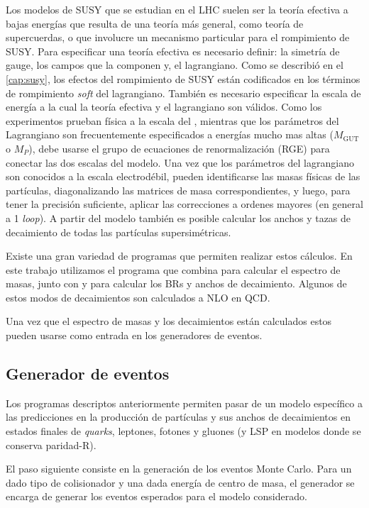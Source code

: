Los modelos de SUSY que se estudian en el LHC suelen ser la teoría efectiva a
bajas energías que resulta de una teoría más general, como teoría de
supercuerdas, o que involucre un mecanismo particular para el rompimiento de
SUSY. Para especificar una teoría efectiva es necesario definir: la simetría de
gauge, los campos que la componen y, el lagrangiano. Como se describió en el
\cref{cap:susy}, los efectos del rompimiento de SUSY están codificados en los
términos de rompimiento \emph{soft} del lagrangiano. También es necesario especificar
la escala de energía a la cual la teoría efectiva y el lagrangiano son válidos.
Como los experimentos prueban física a la escala del {\tev}, mientras que los
parámetros del Lagrangiano son frecuentemente especificados a energías mucho mas
altas ($M_\text{GUT}$ o $M_P$), debe usarse el grupo de ecuaciones de
renormalización (RGE) para conectar las dos escalas del modelo. Una vez que los
parámetros del lagrangiano son conocidos a la escala electrodébil, pueden
identificarse las masas físicas de las partículas, diagonalizando las matrices
de masa correspondientes, y luego, para tener la precisión suficiente, aplicar
las correcciones a ordenes mayores (en general a 1 \emph{loop}). A partir del modelo
también es posible calcular los anchos y tazas de decaimiento de todas las
partículas supersimétricas.

Existe una gran variedad de programas que permiten realizar estos cálculos. En
este trabajo utilizamos el programa {\susyhit}\cite{Djouadi:2006bz} que combina
{\suspect}\cite{Djouadi2007426} para calcular el espectro de masas, junto con
{\sdecay}\cite{Muhlleitner:2004mka} y {\hdecay}\cite{Djouadi:1997yw} para
calcular los BRs y anchos de decaimiento. Algunos de estos modos de decaimientos
son calculados a NLO en QCD.

Una vez que el espectro de masas y los decaimientos están calculados estos
pueden usarse como entrada en los generadores de eventos.


\subsection{Generador de eventos}

Los programas descriptos anteriormente permiten pasar de un modelo específico a las
predicciones en la producción de partículas y sus anchos de decaimientos en
estados finales de \emph{quarks}, leptones, fotones y gluones (y LSP en modelos donde
se conserva paridad-R).

El paso siguiente consiste en la generación de los eventos Monte Carlo.
Para un dado tipo de colisionador y una dada energía de centro de masa,
el generador se encarga de generar los eventos esperados para el modelo
considerado.

